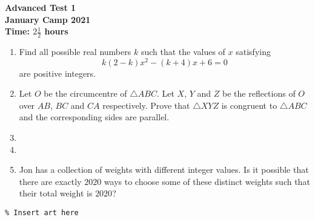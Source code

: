 \documentclass{article}
\begin{document}
\thispagestyle{empty}

\begin{center}
  \textbf{\Large Advanced Test 1}
  \\ \vspace{1em}
  \textbf{\large January Camp 2021}
  \\ \vspace{1em}
  \textbf{\large Time: $2\frac{1}{2}$ hours}
\end{center}

\vspace{24pt}

\begin{enumerate}[1.]

\item %
Find all possible real numbers $k$ such that the values of $x$ satisfying
$$k(2 - k)x^2 - (k + 4)x + 6 = 0$$
are positive integers.


\item %
Let $O$ be the circumcentre of $\triangle ABC$. Let $X$, $Y$ and $Z$ be the reflections of $O$ over $AB$, $BC$ and $CA$ respectively. Prove that $\triangle XYZ$ is congruent to $\triangle ABC$ and the corresponding sides are parallel.


\item %


\item %


\item %
Jon has a collection of weights with different integer values. Is it possible that there are exactly $2020$ ways to choose some of these distinct weights such that their total weight is $2020$?

\end{enumerate}


\vfill
\begin{center} \begin{verbatim}
% Insert art here
\end{verbatim} \end{center}
\end{document}
